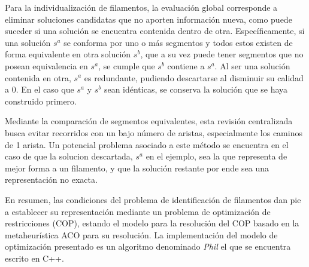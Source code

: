 Para la individualizaci\'on de filamentos, la evaluaci\'on global corresponde a eliminar soluciones candidatas que no aporten informaci\'on nueva, como puede suceder si una soluci\'on se encuentra contenida dentro de otra. Espec\'ificamente, si una soluci\'on $s^{a}$ se conforma por uno o m\'as segmentos y todos estos existen de forma equivalente en otra soluci\'on $s^{b}$, que a su vez puede tener segmentos que no posean equivalencia en $s^{a}$, se cumple que $s^{b}$ contiene a $s^{a}$. Al ser una soluci\'on contenida en otra, $s^{a}$ es redundante, pudiendo descartarse al disminuir su calidad a 0. En el caso que $s^{a}$ y $s^{b}$ sean id\'enticas, se conserva la soluci\'on que se haya construido primero. 
 
    

Mediante la comparaci\'on de segmentos equivalentes, esta revisi\'on centralizada busca evitar recorridos con un bajo n\'umero de aristas, especialmente los caminos de 1 arista. Un potencial problema asociado a este m\'etodo se encuentra en el caso de que la solucion descartada, $s^{a}$ en el ejemplo, sea la que representa de mejor forma a un filamento, y que la soluci\'on restante por ende sea una representaci\'on no exacta.


\vspace{1cm}
En resumen, las condiciones del problema de identificaci\'on de filamentos dan pie a establecer su representaci\'on mediante un problema de optimizaci\'on de restricciones (COP), estando el modelo para la resoluci\'on del COP basado en la metaheur\'istica ACO para su resoluci\'on. La implementaci\'on del modelo de optimizaci\'on presentado es un algoritmo denominado {\it Phil} el que se encuentra escrito en C++.